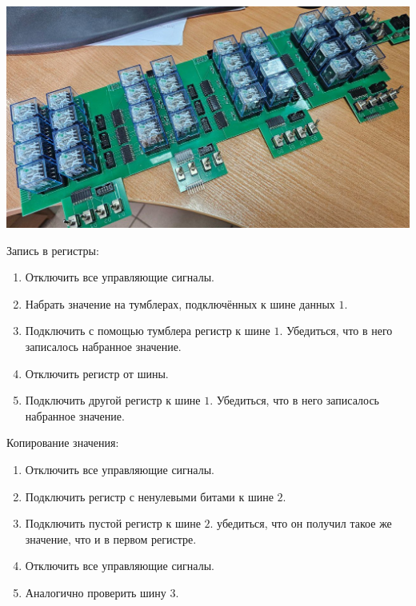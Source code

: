 \includegraphics[width=\columnwidth]{photo/register_file.jpg}

Запись в регистры:

\begin{enumerate}
    \item Отключить все управляющие сигналы.
    \item Набрать значение на тумблерах, подключённых к шине данных $1$.
    \item Подключить с помощью тумблера регистр к шине $1$. Убедиться, что в него записалось набранное значение.
    \item Отключить регистр от шины.
    \item Подключить другой регистр к шине $1$. Убедиться, что в него записалось набранное значение.
\end{enumerate}

Копирование значения:

\begin{enumerate}
    \item Отключить все управляющие сигналы.
    \item Подключить регистр с ненулевыми битами к шине $2$.
    \item Подключить пустой регистр к шине $2$. убедиться, что он получил такое же значение, что и в первом регистре.
    \item Отключить все управляющие сигналы.
    \item Аналогично проверить шину $3$.
\end{enumerate}

